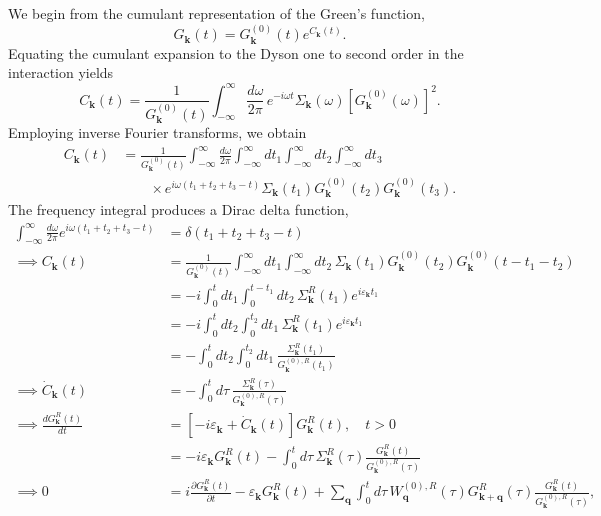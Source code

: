 We begin from the cumulant representation of the Green's function,
\begin{equation}
    G_{\bm{k}}(t)
    =
    G_{\bm{k}}^{(0)}(t)e^{C_{\bm{k}}(t)}.
\end{equation}
Equating the cumulant expansion to the Dyson one to second order in the interaction yields 
\begin{equation}
    C_{\bm{k}}(t)
    =
    \frac{1}{G_{\bm{k}}^{(0)}(t)}
    \int_{-\infty}^{\infty}
    \frac{d\omega}{2\pi}\,
    e^{-i\omega t}
    \Sigma_{\bm{k}}(\omega)
    \left[
        G_{\bm{k}}^{(0)}(\omega)
    \right]^2.
\end{equation}
Employing inverse Fourier transforms, we obtain
\begin{align}
    C_{\bm{k}}(t)
    &=
    \frac{1}{G_{\bm{k}}^{(0)}(t)}
    \int_{-\infty}^{\infty}
    \frac{d\omega}{2\pi}
    \int_{-\infty}^{\infty}dt_1
    \int_{-\infty}^{\infty}dt_2
    \int_{-\infty}^{\infty}dt_3
    \nonumber\\
    &\qquad\times
    e^{i\omega(t_1+t_2+t_3-t)}
    \Sigma_{\bm{k}}(t_1)
    G_{\bm{k}}^{(0)}(t_2)
    G_{\bm{k}}^{(0)}(t_3).
\end{align}
The frequency integral produces a Dirac delta function,
\begin{align}
    \int_{-\infty}^{\infty}
    \frac{d\omega}{2\pi}
    e^{i\omega(t_1+t_2+t_3-t)}
    &=
    \delta(t_1+t_2+t_3-t)\\
\implies 
    C_{\bm{k}}(t)
    &=
    \frac{1}{G_{\bm{k}}^{(0)}(t)}
    \int_{-\infty}^{\infty}dt_1
    \int_{-\infty}^{\infty}dt_2\,
    \Sigma_{\bm{k}}(t_1)
    G_{\bm{k}}^{(0)}(t_2)
    G_{\bm{k}}^{(0)}(t-t_1-t_2)\\
&=     -i
    \int_0^t dt_1
    \int_0^{t-t_1}dt_2\,
    \Sigma_{\bm{k}}^{R}(t_1)
    e^{i\varepsilon_{\bm{k}}t_1}\\
&=     -i
    \int_0^t dt_2
    \int_0^{t_2}dt_1\,
    \Sigma_{\bm{k}}^{R}(t_1)
    e^{i\varepsilon_{\bm{k}}t_1}\\
&=     -
    \int_0^t dt_2
    \int_0^{t_2}dt_1\,
    \frac{
        \Sigma_{\bm{k}}^{R}(t_1)
    }{
        G_{\bm{k}}^{(0),R}(t_1)
    }\\
\implies 
    \dot C_{\bm{k}}(t)
    &=
    -
    \int_0^t d\tau\,
    \frac{
        \Sigma_{\bm{k}}^{R}(\tau)
    }{
        G_{\bm{k}}^{(0),R}(\tau)
    }\\
\implies 
    \frac{dG_{\bm{k}}^{R}(t)}{dt}
    &=
    \left[
        -i\varepsilon_{\bm{k}}
        +
        \dot C_{\bm{k}}(t)
    \right]
    G_{\bm{k}}^{R}(t), \quad t>0\\
    &=
    -i\varepsilon_{\bm{k}}G_{\bm{k}}^{R}(t)
    -
    \int_0^t d\tau\,
    \Sigma_{\bm{k}}^{R}(\tau)
    \frac{
        G_{\bm{k}}^{R}(t)
    }{
        G_{\bm{k}}^{(0),R}(\tau)
    }\\
\implies
    0
    &=
    i\frac{\partial G_{\bm{k}}^{R}(t)}{\partial t}
    -
    \varepsilon_{\bm{k}}G_{\bm{k}}^{R}(t)
    +
    \sum_{\bm q}
    \int_0^t d\tau\,
    W_{\bm q}^{(0),R}(\tau)
    G_{\bm{k}+\bm q}^{R}(\tau)
    \frac{
        G_{\bm{k}}^{R}(t)
    }{
        G_{\bm{k}}^{(0),R}(\tau)
    },
\end{align}
